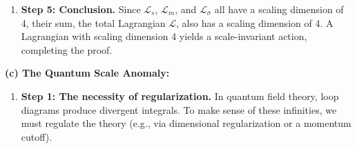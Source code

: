 \begin{solution}
\begin{enumerate}
    Now we can compute the variation of $\mathcal{L}_\sigma = \frac{1}{2f^2}g^{\mu\nu}(\partial_\mu\Psi)(\partial_\nu\Psi)$:
    \[ \delta\mathcal{L}_\sigma = \frac{1}{2f^2}g^{\mu\nu} \left[ \delta(\partial_\mu\Psi)(\partial_\nu\Psi) + (\partial_\mu\Psi)\delta(\partial_\nu\Psi) \right] \]
    Since the expression is symmetric in $\mu, \nu$, this becomes:
    \[ \delta\mathcal{L}_\sigma = \frac{1}{f^2}g^{\mu\nu} (\partial_\nu\Psi) \delta(\partial_\mu\Psi) \]
    Substitute the transformation rule for $\delta(\partial_\mu\Psi)$:
    \[ \delta\mathcal{L}_\sigma = \frac{1}{f^2}g^{\mu\nu} (\partial_\nu\Psi) \left[ 2(\partial_\mu\Psi) + x^\lambda\partial_\lambda(\partial_\mu\Psi) \right] \]
    \[ \delta\mathcal{L}_\sigma = \frac{2}{f^2}g^{\mu\nu}(\partial_\nu\Psi)(\partial_\mu\Psi) + \frac{1}{f^2}g^{\mu\nu} (\partial_\nu\Psi) x^\lambda\partial_\lambda(\partial_\mu\Psi) \]
    The first term is exactly $4\mathcal{L}_\sigma$. The second term is $x^\lambda\partial_\lambda\mathcal{L}_\sigma$ by the product rule for derivatives:
    \[ x^\lambda\partial_\lambda\mathcal{L}_\sigma = x^\lambda\partial_\lambda \left( \frac{1}{2f^2}g^{\mu\nu}(\partial_\mu\Psi)(\partial_\nu\Psi) \right) = \frac{1}{2f^2}g^{\mu\nu}x^\lambda \left[ (\partial_\lambda\partial_\mu\Psi)(\partial_\nu\Psi) + (\partial_\mu\Psi)(\partial_\lambda\partial_\nu\Psi) \right] \]
    \[ x^\lambda\partial_\lambda\mathcal{L}_\sigma = \frac{1}{f^2}g^{\mu\nu}x^\lambda (\partial_\nu\Psi) (\partial_\lambda\partial_\mu\Psi) \]
    Therefore, we have shown:
    \[ \delta\mathcal{L}_\sigma = 4\mathcal{L}_\sigma + x^\lambda\partial_\lambda\mathcal{L}_\sigma \]
    This confirms that $\mathcal{L}_\sigma$ also has a scaling dimension of 4.

    \item \textbf{Step 5: Conclusion.}
    Since $\mathcal{L}_s$, $\mathcal{L}_m$, and $\mathcal{L}_\sigma$ all have a scaling dimension of 4, their sum, the total Lagrangian $\mathcal{L}$, also has a scaling dimension of 4. A Lagrangian with scaling dimension 4 yields a scale-invariant action, completing the proof.
\end{enumerate}

\textbf{(c) The Quantum Scale Anomaly:}
\begin{enumerate}
    \item \textbf{Step 1: The necessity of regularization.}
    In quantum field theory, loop diagrams produce divergent integrals. To make sense of these infinities, we must regulate the theory (e.g., via dimensional regularization or a momentum cutoff).
    

\end{enumerate}
\end{solution}
